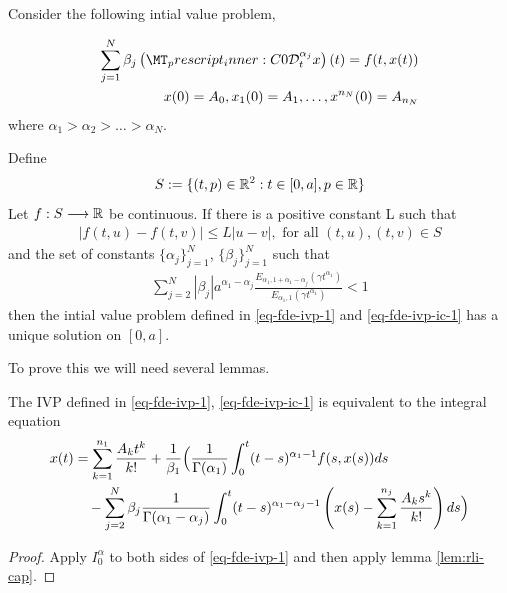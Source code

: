 \begin{mdframed}[innertopmargin=10pt]
\begin{theorem}[Uniqueness]
\label{thm-existence-uniq}
Consider the following intial value problem,

	\begin{align}
		\label{eq-fde-ivp-1}
		\sum_{j=1}^{N} \beta_j\capder{0}{t}{\alpha_j}{x}(t) = f(t,x(t)) \\
		\label{eq-fde-ivp-ic-1}
		x(0) = A_0, x_1(0) = A_1, \ldots, x^{n_N}(0) = A_{n_N}
	\end{align}
	where $ \alpha_1 > \alpha_2 > \ldots > \alpha_N $.
	
	Define
		\begin{align}
		 S:= \{ (t,p) \in \mathbb{R}^2 : t \in [0, a], p \in \mathbb{R} \} 
		\end{align}
	Let $ f : S \longrightarrow \mathbb{R} $ be continuous. If there is a positive constant L such that 
		\begin{align}
		\label{eq:uniq-lipshitz}
		|f(t,u) - f(t,v)| \leq L|u-v|, \text{ for all } (t,u), (t,v) \in S
		\end{align}
and the set of constants $ \{ \alpha_j \}_{j = 1}^{N} $, $ \{ \beta_j \}_{j=1}^N $
such that
	\begin{align}
	    \label{eq:fde-uniq-cond}
		\sum_{j=2}^N |\beta_j| a^{\alpha_1 - \alpha_j} \frac{E_{\alpha_1,1+\alpha_1-\alpha_j}(\gamma t^{\alpha_1})}{E_{\alpha_1,1}(\gamma t^{\alpha_1})} < 1
	\end{align}
	then the intial value problem defined in \ref{eq-fde-ivp-1} and \ref{eq-fde-ivp-ic-1} has a unique solution on $ [0, a] $.
\end{theorem}
\end{mdframed}
To prove this we will need several lemmas. 
\begin{mdframed}[innertopmargin=10pt]
\begin{lemma}
	The IVP defined in \eqref{eq-fde-ivp-1}, \eqref{eq-fde-ivp-ic-1} is equivalent to the integral equation
	\begin{align}
		x(t) &= \sum_{k=1}^{n_1}\frac{A_kt^k}{k!} + \frac{1}{\beta_1} \Bigl( \frac{1}{\Gamma(\alpha_1)}\int_{0}^{t} (t-s)^{\alpha_1 - 1}f(s,x(s))ds \\
			& \ \ \ - \sum_{j=2}^{N}\beta_j \frac{1}{\Gamma(\alpha_1 - \alpha_j)}
			\int_{0}^{t}(t-s)^{\alpha_1 - \alpha_j - 1}\left(x(s) - \sum_{k=1}^{n_j}\frac{A_ks^k}{k!} \right) ds \Bigr)
	\end{align}
\end{lemma}
\end{mdframed}
\begin{proof}
	Apply $ I_0^\alpha $ to both sides of \eqref{eq-fde-ivp-1} and then apply lemma \ref{lem:rli-cap}.
\end{proof}

